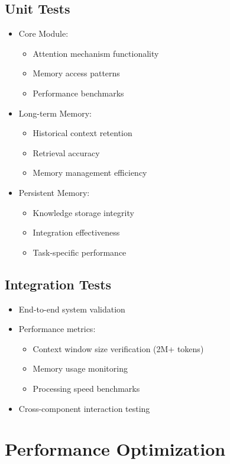 \documentclass{article}
\begin{document}
\subsection{Unit Tests}
\begin{itemize}
    \item Core Module:
    \begin{itemize}
        \item Attention mechanism functionality
        \item Memory access patterns
        \item Performance benchmarks
    \end{itemize}
    \item Long-term Memory:
    \begin{itemize}
        \item Historical context retention
        \item Retrieval accuracy
        \item Memory management efficiency
    \end{itemize}
    \item Persistent Memory:
    \begin{itemize}
        \item Knowledge storage integrity
        \item Integration effectiveness
        \item Task-specific performance
    \end{itemize}
\end{itemize}

\subsection{Integration Tests}
\begin{itemize}
    \item End-to-end system validation
    \item Performance metrics:
    \begin{itemize}
        \item Context window size verification (2M+ tokens)
        \item Memory usage monitoring
        \item Processing speed benchmarks
    \end{itemize}
    \item Cross-component interaction testing
\end{itemize}

\section{Performance Optimization}
\end{document}
